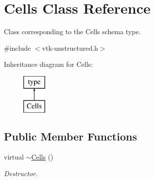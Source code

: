 \hypertarget{classCells}{\section{Cells Class Reference}
\label{classCells}
}


Class corresponding to the Cells schema type.  




{\ttfamily \#include $<$vtk-\/unstructured.\-h$>$}

Inheritance diagram for Cells\-:\begin{figure}[H]
\begin{center}
\leavevmode
\includegraphics[height=2.000000cm]{classCells}
\end{center}
\end{figure}
\subsection*{Public Member Functions}
\begin{DoxyCompactItemize}
\item 
virtual \hyperlink{classCells_aab121634db81b439226a33fd099fb3c1}{$\sim$\-Cells} ()
\begin{DoxyCompactList}\small\item\em Destructor. \end{DoxyCompactList}\end{DoxyCompactItemize}
